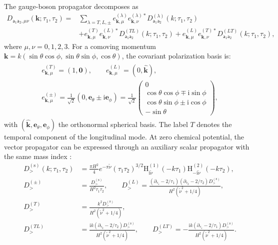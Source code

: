 \documentclass[a4paper,12pt]{article}
\def\mb{\mathbf}
\def\ii{\mathrm{i}}
\def\aa{\mathsf{a}}
\begin{document}
The gauge-boson propagator decomposes as
\begin{align}
    D_{\aa_1\aa_2,\mu\nu}(\mb k;\tau_1,\tau_2)
    ={}&\sum_{\lambda=T,L,\pm}
    e^{(\lambda)}_{\mb k,\mu}e^{(\lambda)*}_{\mb k,\nu}
    D^{(\lambda)}_{\aa_1\aa_2}(k;\tau_1,\tau_2)
    \nonumber\\
    &+e^{(T)}_{\mb k,\mu}e^{(L)*}_{\mb k,\nu}
    D^{(TL)}_{\aa_1\aa_2}(k;\tau_1,\tau_2)
    +e^{(L)}_{\mb k,\mu}e^{(T)*}_{\mb k,\nu}
    D^{(LT)}_{\aa_1\aa_2}(k;\tau_1,\tau_2),
    \label{eq:polarization-decomposition}
\end{align}
where $\mu,\nu=0,1,2,3$.
For a comoving momentum $\mb k = k(\sin\theta\cos\phi, \sin\theta\sin\phi,\cos\theta)$, the covariant polarization basis is:
\begin{align}
    \begin{gathered}
    e^{(T)}_{\mb k,\mu}=(1,\mb0),\qquad
    e^{(L)}_{\mb k,\mu}=(0,\widehat{\mb k}),\\
    e^{(\pm)}_{\mb k,\mu}
    =\frac1{\sqrt2}(0,\mb e_\theta\pm\ii\mb e_\phi)
    =\frac1{\sqrt2}\begin{pmatrix}
        0\\
        \cos\theta\cos\phi\mp\ii\sin\phi\\
        \cos\theta\sin\phi\pm\ii\cos\phi\\
        -\sin\theta
    \end{pmatrix},
    \end{gathered}
\end{align}
with $(\widehat{\mb k},\mb e_\theta,\mb e_\phi)$ the orthonormal spherical basis.
The label $T$ denotes the temporal component of the longitudinal mode.
At zero chemical potential, the vector propagator can be expressed through an auxiliary scalar propagator with the same mass index \cite{qin_helical_2023,qin_closed-form_2023}:
\begin{align}
    D^{(\mathrm{s})}_>(k;\tau_1,\tau_2)
    &=\frac{\pi H^2}{4}e^{-\pi\tilde\nu}
    (\tau_1\tau_2)^{3/2}
    \mathrm H^{(1)}_{\ii\tilde\nu}(-k\tau_1)
    \mathrm H^{(2)}_{-\ii\tilde\nu}(-k\tau_2),
    \label{eq:scalar-propagator}\\
    D^{(\pm)}_>&=\frac{D^{(\mathrm{s})}_>}{H^2\tau_1\tau_2},\qquad
    D^{(L)}_>=\frac{(\partial_{\tau_1}-2/\tau_1)
    (\partial_{\tau_2}-2/\tau_2)D^{(\mathrm{s})}_>}
    {H^2(\tilde\nu^2+1/4)},
    \label{eq:vector-scalar-relation}\\
    D^{(T)}_>&=\frac{k^2D^{(\mathrm{s})}_>}
    {H^2(\tilde\nu^2+1/4)},
    \label{eq:temporal-scalar-relation}\\
    D^{(TL)}_>&=\frac{\ii k(\partial_{\tau_2}-2/\tau_2)D^{(\mathrm{s})}_>}
    {H^2(\tilde\nu^2+1/4)},\qquad
    D^{(LT)}_>=-\frac{\ii k(\partial_{\tau_1}-2/\tau_1)D^{(\mathrm{s})}_>}
    {H^2(\tilde\nu^2+1/4)}.
    \label{eq:mixed-scalar-relations}
\end{align}
\end{document}
